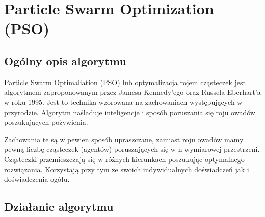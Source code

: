 
\section{Particle Swarm Optimization (PSO)}
\author{Paweł Jastrzębski}
\subsection{Ogólny opis algorytmu}
\par Particle Swarm Optimaliation (PSO) lub optymalizacja rojem cząsteczek jest algorytmem zaproponowanym przez Jamesa Kennedy'ego oraz Russela Eberhart'a w roku 1995. Jest to technika wzorowana na zachowaniach występujących w przyrodzie. Algorytm naśladuje inteligencje i sposób poruszania się roju owadów poszukujących pożywienia. 
\par Zachowania te są w pewien sposób upraszczane, zamiast roju owadów mamy pewną liczbę cząsteczek (agentów) poruszających się w n-wymiarowej przestrzeni. Cząsteczki przemieszczają się w różnych kierunkach poszukując optymalnego rozwiązania. Korzystają przy tym ze swoich indywidualnych doświadczeń jak i doświadczenia ogółu.
\subsection{Działanie algorytmu}
